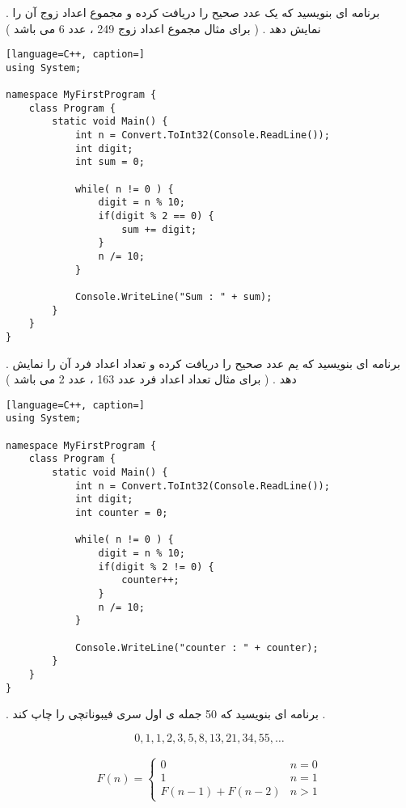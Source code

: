 \documentclass[12pt]{article}
\begin{document}
\newpage

 . برنامه ای بنویسید که یک عدد صحیح را دریافت کرده و مجموع اعداد زوج آن را نمایش دهد . ( برای مثال مجموع اعداد زوج 249 ، عدد 6 می باشد )




\begin{latin}
\begin{lstlisting}[language=C++, caption=]
using System;

namespace MyFirstProgram {
	class Program {
		static void Main() {
			int n = Convert.ToInt32(Console.ReadLine());
			int digit;
			int sum = 0;
			
			while( n != 0 ) {
				digit = n % 10;
				if(digit % 2 == 0) {
					sum += digit;
				}
				n /= 10;
			}
			
			Console.WriteLine("Sum : " + sum);
		}
	}
}
\end{lstlisting}
\end{latin}






\newpage

 . برنامه ای بنویسید که یم عدد صحیح را دریافت کرده و تعداد اعداد فرد آن را نمایش دهد . ( برای مثال تعداد اعداد فرد عدد 163 ، عدد 2 می باشد )




\begin{latin}
\begin{lstlisting}[language=C++, caption=]
using System;

namespace MyFirstProgram {
	class Program {
		static void Main() {
			int n = Convert.ToInt32(Console.ReadLine());
			int digit;
			int counter = 0;
			
			while( n != 0 ) {
				digit = n % 10;
				if(digit % 2 != 0) {
					counter++;
				}
				n /= 10;
			}
			
			Console.WriteLine("counter : " + counter);
		}
	}
}
\end{lstlisting}
\end{latin}









\newpage

 . برنامه ای بنویسید که 50 جمله ی اول سری فیبوناتچی را چاپ کند .

$$
0 , 1 , 1 , 2 , 3 , 5 , 8 , 13 , 21 , 34 , 55 , \dots
$$


\begin{align*}
F(n) = 
\begin{cases}
0 & n = 0 \\
1 & n = 1 \\
F(n-1) + F(n-2) & n > 1 
\end{cases}
\end{align*}
\end{document}
